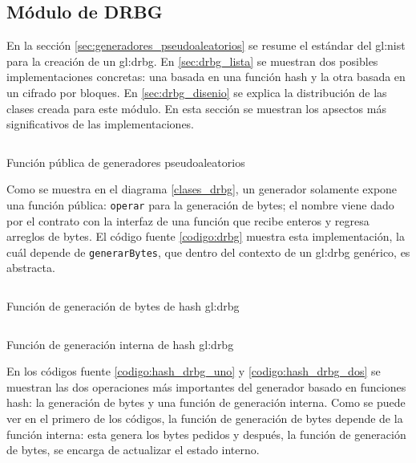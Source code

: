 %
%
%

\subsection{Módulo de DRBG}

En la sección \ref{sec:generadores_pseudoaleatorios} se resume el estándar del
\gls{gl:nist} para la  creación de un \gls{gl:drbg}. En \ref{sec:drbg_lista} se
muestran dos posibles implementaciones concretas: una basada en una función
hash y la  otra basada en un cifrado por bloques. En \ref{sec:drbg_disenio} se
explica la distribución de las clases creada para este módulo. En esta sección
se muestran los apsectos más significativos de las implementaciones.

\begin{listing}
  \inputminted[firstline=66, lastline=90]
    {c++}{../implementaciones/drbg/drbg.cpp}
  \caption{Función pública de generadores pseudoaleatorios}
  \label{codigo:drbg}
\end{listing}

Como se muestra en el diagrama \ref{clases_drbg}, un generador solamente
expone una función pública: \texttt{operar} para la generación de bytes; el
nombre viene dado por el contrato con la interfaz de una función que
recibe enteros y regresa arreglos de bytes. El código fuente \ref{codigo:drbg}
muestra esta implementación, la cuál depende de \texttt{generarBytes}, que
dentro del contexto de un \gls{gl:drbg} genérico, es abstracta.

\begin{listing}
  \inputminted[firstline=117, lastline=135]
    {c++}{../implementaciones/drbg/hash_drbg.cpp}
  \caption{Función de generación de bytes de hash \gls{gl:drbg}}
  \label{codigo:hash_drbg_uno}
\end{listing}

\begin{listing}
  \inputminted[firstline=166, lastline=186]
    {c++}{../implementaciones/drbg/hash_drbg.cpp}
  \caption{Función de generación interna de hash \gls{gl:drbg}}
  \label{codigo:hash_drbg_dos}
\end{listing}

En los códigos fuente \ref{codigo:hash_drbg_uno} y \ref{codigo:hash_drbg_dos}
se muestran las dos operaciones más importantes del generador basado en
funciones hash: la generación de bytes y una función de generación interna.
Como se puede ver en el primero de los códigos, la función de generación de
bytes depende de la función interna: esta genera los bytes pedidos y después,
la función de generación de bytes, se encarga de actualizar el estado interno.

